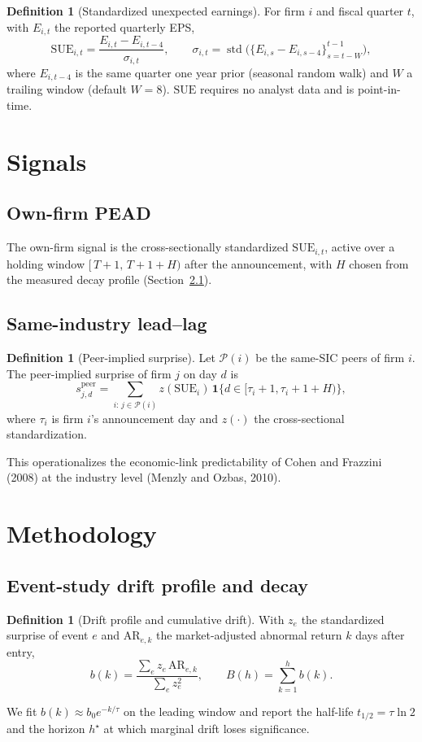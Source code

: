 \documentclass[11pt,a4paper]{article}
\theoremstyle{plain}
\theoremstyle{definition}
\newtheorem{definition}[theorem]{Definition}
\newcommand{\SUE}{\mathrm{SUE}}
\newcommand{\AR}{\mathrm{AR}}
\begin{document}
\begin{definition}[Standardized unexpected earnings]\label{def:sue}
For firm $i$ and fiscal quarter $t$, with $E_{i,t}$ the reported quarterly EPS,
\[
\SUE_{i,t}=\frac{E_{i,t}-E_{i,t-4}}{\sigma_{i,t}},\qquad
\sigma_{i,t}=\operatorname{std}\bigl(\{E_{i,s}-E_{i,s-4}\}_{s=t-W}^{t-1}\bigr),
\]
where $E_{i,t-4}$ is the same quarter one year prior (seasonal random walk) and $W$ a trailing
window (default $W=8$). $\SUE$ requires no analyst data and is point-in-time.
\end{definition}

\section{Signals}
\label{sec:signals}

\subsection{Own-firm PEAD}
The own-firm signal is the cross-sectionally standardized $\SUE_{i,t}$, active over a holding
window $[\,T{+}1,\,T{+}1{+}H)$ after the announcement, with $H$ chosen from the measured decay
profile (Section~\ref{sec:eventstudy}).

\subsection{Same-industry lead--lag}
\begin{definition}[Peer-implied surprise]\label{def:peer}
Let $\mathcal{P}(i)$ be the same-SIC peers of firm $i$. The peer-implied surprise of firm $j$ on
day $d$ is
\[
s^{\mathrm{peer}}_{j,d}=\sum_{i:\,j\in\mathcal{P}(i)} z(\SUE_{i})\,\mathbf{1}\{d\in[\tau_i{+}1,\tau_i{+}1{+}H)\},
\]
where $\tau_i$ is firm $i$'s announcement day and $z(\cdot)$ the cross-sectional standardization.
\end{definition}
This operationalizes the economic-link predictability of Cohen and Frazzini (2008) at the industry
level (Menzly and Ozbas, 2010).

\section{Methodology}
\label{sec:method}

\subsection{Event-study drift profile and decay}
\label{sec:eventstudy}
\begin{definition}[Drift profile and cumulative drift]\label{def:drift}
With $z_e$ the standardized surprise of event $e$ and $\AR_{e,k}$ the market-adjusted abnormal
return $k$ days after entry,
\[
b(k)=\frac{\sum_e z_e\,\AR_{e,k}}{\sum_e z_e^2},\qquad B(h)=\sum_{k=1}^{h}b(k).
\]
\end{definition}
We fit $b(k)\approx b_0 e^{-k/\tau}$ on the leading window and report the half-life
$t_{1/2}=\tau\ln 2$ and the horizon $h^\star$ at which marginal drift loses significance.
\end{document}
